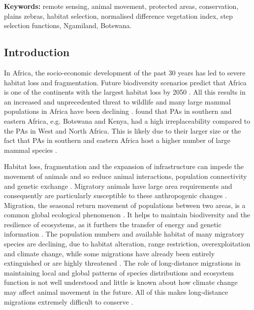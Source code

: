 \documentclass[12pt,a4paper, twoside, english]{article}
\begin{document}
\textbf{Keywords:} remote sensing, animal movement, protected areas, conservation, plains zebras, habitat selection, normalised difference vegetation index, step selection functions, Ngamiland, Botswana.

\subsection{Introduction}

In Africa, the socio-economic development of the past 30 years has led to severe habitat loss and fragmentation. Future biodiversity scenarios predict that Africa is one of the continents with the largest habitat loss by 2050 \citep{Visconti2011}. All this results in an increased and unprecedented threat to wildlife \citep{Brooks2002, Newmark2000, Newmark2008} and many large mammal populations in Africa have been declining \citep{Craigie2010}. \cite{Wegmann2014} found that PAs in southern and eastern Africa, e.g. Botswana and Kenya, had a high irreplaceability compared to the PAs in West and North Africa. This is likely due to their larger size or the fact that PAs in southern and eastern Africa host a higher number of large mammal species \citep{Rondinini2005}. 

Habitat loss, fragmentation and the expansion of infrastructure can impede the movement of animals and so reduce animal interactions, population connectivity and genetic exchange \citep{Fischer2007, Kaczensky2011, Zeller2012, Tracey2013}. Migratory animals have large area requirements and consequently are particularly susceptible to these anthropogenic changes \citep{Berger2004, Bolger2008, Wilcove2008}. Migration, the seasonal return movement of populations between two areas, is a common global ecological phenomenon \citep{Dingle2007, Alerstam2003, Bolger2008, Teitelbaum2015}. It helps to maintain biodiversity and the resilience of ecosystems, as it furthers the transfer of energy and genetic information \citep{Jeltsch2013, Pettorelli2014, Bauer2014}. The population numbers and available habitat of many migratory species are declining, due to habitat alteration, range restriction, overexploitation and climate change, while some migrations have already been entirely extinguished or are highly threatened \citep{Fryxell1988, Serneels2001a, Bolger2008, Berger2004, Wilcove2008, Harris2009}. 
The role of long-distance migrations in maintaining local and global patterns of species distributions and ecosystem function is not well understood \citep{Jeltsch2013} and little is known about how climate change may affect animal movement in the future. All of this makes long-distance migrations extremely difficult to conserve \citep{Wilcove2008}.
\end{document}
